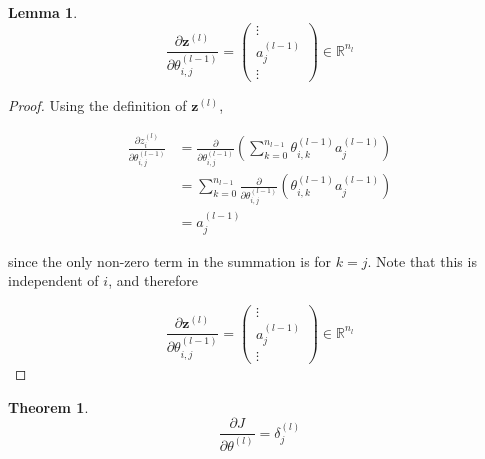 \documentclass{article}[11pt]
\newtheorem{lemma}{Lemma}
\newtheorem{theorem}{Theorem}
\begin{document}
        
        
        
        \begin{lemma}
            
            $$
            \frac{\partial \mathbf{z}^{(l)}}{\partial \theta^{(l-1)}_{i,j}} = \begin{pmatrix} \vdots \\ a^{(l-1)}_j \\ \vdots \end{pmatrix} \in \mathbb{R}^{n_l}
            $$
        
        \end{lemma}
        
        \begin{proof}
            
            Using the definition of $\mathbf{z}^{(l)}$,
            
            $$ \begin{aligned}
            \frac{\partial z^{(l)}_i}{\partial \theta^{(l-1)}_{i,j}}
            &= \frac{\partial}{\partial \theta^{(l-1)}_{i,j}} \left( \sum_{k = 0}^{n_{l-1}} \theta^{(l-1)}_{i,k} a^{(l-1)}_j \right) \\
            &= \sum_{k = 0}^{n_{l-1}} \frac{\partial}{\partial \theta^{(l-1)}_{i,j}} \left( \theta^{(l-1)}_{i,k} a^{(l-1)}_j \right) \\
            &= a^{(l-1)}_j
            \end{aligned} $$
            
            since the only non-zero term in the summation is for $k = j$. Note that this is independent of $i$, and therefore
            
            $$
            \frac{\partial \mathbf{z}^{(l)}}{\partial \theta^{(l-1)}_{i,j}} = \begin{pmatrix} \vdots \\ a^{(l-1)}_j \\ \vdots \end{pmatrix} \in \mathbb{R}^{n_l}
            $$
            
        \end{proof}
        
        
        
        
        \begin{theorem}
            
            $$
            \frac{\partial J}{\partial \theta^{(l)}} = \delta^{(l)}_j
            $$
        \end{theorem}
        
\end{document}
